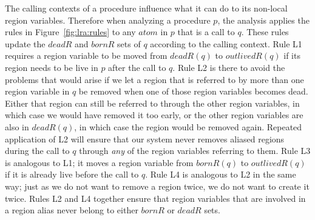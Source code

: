 \documentclass{tlp}
\newcommand{\bornR}[1]{\ensuremath{{bornR}(#1)}}
\newcommand{\deadR}[1]{\ensuremath{{deadR}(#1)}}
\newcommand{\outlivedR}[1]{\ensuremath{{outlivedR}(#1)}}
\def\bornRegs{\mathit{bornR}}
\def\deadRegs{\mathit{deadR}}
\begin{document}
The calling contexts of a procedure influence
what it can do to its non-local region variables.
Therefore when analyzing a procedure $p$, the analysis
applies the rules in Figure~\ref{fig:lra:rules}
to any ${atom}$ in $p$ that is a call to $q$.
These rules update the $\deadRegs$ and $\bornRegs$ sets of $q$
according to the calling context.
Rule L1 requires
a region variable to be moved from \deadR{q} to \outlivedR{q}
if its region needs to be live in $p$ after the call to $q$.
Rule L2 is there to avoid the problems that would arise
if we let a region that is referred to by more than one region variable in $q$
be removed when one of those region variables becomes dead.
Either that region can still be referred to through the other region variables,
in which case we would have removed it too early,
or the other region variables are also in \deadR{q},
in which case the region would be removed again.
Repeated application of L2 will ensure that our system
never removes aliased regions during the call to $q$
through \emph{any} of the region variables referring to them.
Rule L3 is analogous to L1;
it moves a region variable from \bornR{q} to \outlivedR{q}
if it is already live before the call to $q$.
Rule L4 is analogous to L2 in the same way;
just as we do not want to remove a region twice,
we do not want to create it twice.
Rules L2 and L4 together ensure that
region variables that are involved in a region alias
never belong to either $\bornRegs$ or $\deadRegs$ sets.
\end{document}
